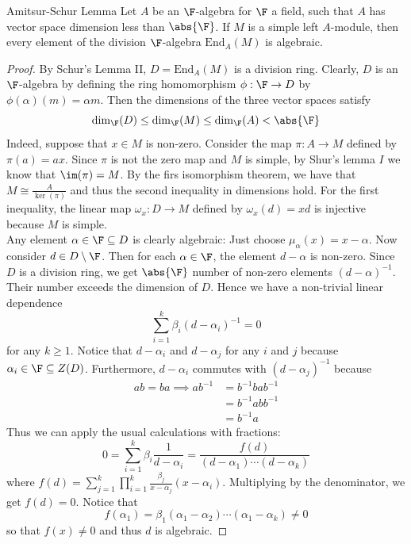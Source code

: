 \documentclass[a4paper]{article}
\begin{document}
\begin{thm}{Amitsur-Schur Lemma}{} Let $A$ be an $\F$-algebra for $\F$ a field, such that $A$ has vector space dimension less than $\abs{\F}$. If $M$ is a simple left $A$-module, then every element of the division $\F$-algebra $\text{End}_A(M)$ is algebraic. 
\begin{proof}
By Schur's Lemma II, $D=\text{End}_A(M)$ is a division ring. Clearly, $D$ is an $\F$-algebra by defining the ring homomorphism $\phi:\F\to D$ by $\phi(\alpha)(m)=\alpha m$. Then the dimensions of the three vector spaces satisfy $$\dim_\F(D)\leq\dim_\F(M)\leq\dim_\F(A)<\abs{\F}$$ Indeed, suppose that $x\in M$ is non-zero. Consider the map $\pi:A\to M$ defined by $\pi(a)=ax$. Since $\pi$ is not the zero map and $M$ is simple, by Shur's lemma $I$ we know that $\im(\pi)=M$. By the firs isomorphism theorem, we have that $M\cong\frac{A}{\ker(\pi)}$ and thus the second inequality in dimensions hold. For the first inequality, the linear map $\omega_x:D\to M$ defined by $\omega_x(d)=xd$ is injective because $M$ is simple. \\

Any element $\alpha\in\F\subseteq D$ is clearly algebraic: Just choose $\mu_\alpha(x)=x-\alpha$. Now consider $d\in D\setminus\F$. Then for each $\alpha\in\F$, the element $d-\alpha$ is non-zero. Since $D$ is a division ring, we get $\abs{\F}$ number of non-zero elements $(d-\alpha)^{-1}$. Their number exceeds the dimension of $D$. Hence we have a non-trivial linear dependence $$\sum_{i=1}^k\beta_i(d-\alpha_i)^{-1}=0$$ for any $k\geq 1$. Notice that $d-\alpha_i$ and $d-\alpha_j$ for any $i$ and $j$ because $\alpha_i\in\F\subseteq Z(D)$. Furthermore, $d-\alpha_i$ commutes with $(d-\alpha_j)^{-1}$ because 
\begin{align*}
ab=ba\implies ab^{-1}&=b^{-1}bab^{-1}\\
&=b^{-1}abb^{-1}\\
&=b^{-1}a
\end{align*}
Thus we can apply the usual calculations with fractions: $$0=\sum_{i=1}^k\beta_i\frac{1}{d-\alpha_i}=\frac{f(d)}{(d-\alpha_1)\cdots(d-\alpha_k)}$$ where $f(d)=\sum_{j=1}^k\prod_{i=1}^k\frac{\beta_j}{x-\alpha_j}(x-\alpha_i)$. Multiplying by the denominator, we get $f(d)=0$. Notice that $$f(\alpha_1)=\beta_1(\alpha_1-\alpha_2)\cdots(\alpha_1-\alpha_k)\neq 0$$ so that $f(x)\neq 0$ and thus $d$ is algebraic. 
\end{proof}
\end{thm}
\end{document}
